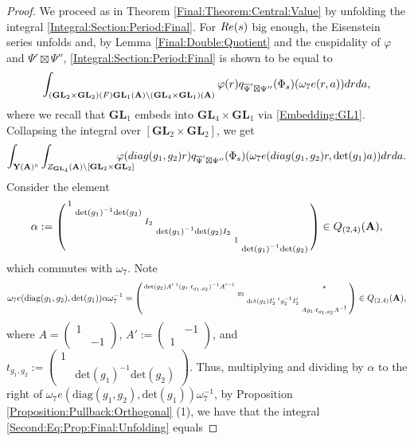 \documentclass[10pt,a4paper]{amsart}
\def\A{{\bf A}}
\def\GL{\mathbf{GL}}
\def\det{\mathrm{det}}
\begin{document}
\begin{proof}
    We proceed as in Theorem \ref{Final:Theorem:Central:Value} by unfolding the integral \eqref{Integral:Section:Period:Final}. For ${\rm Re}(s)$ big enough, the Eisenstein series unfolds and, by Lemma \ref{Final:Double:Quotient} and the cuspidality of $\varphi$ and $\Psi'\boxtimes\Psi''$, \eqref{Integral:Section:Period:Final} is shown to be equal to    \begin{equation}\label{First:Eq:Prop:Final:Unfolding}\int_{ (\GL_2 \times \GL_2)(F) \GL_1(\A) \backslash (\GL_4 \times \GL_1)(\A)}\varphi(r) q_{\overline{\Psi}'\boxtimes\Psi''}(\Phi_{s})(\omega_7 e(r,a)) drda,\end{equation}  
    where we recall that $\GL_1$ embeds into $\GL_4\times \GL_1$ via \eqref{Embedding:GL1}. Collapsing the integral over $[\GL_2 \times \GL_2]$, we get 
\begin{equation}\label{Second:Eq:Prop:Final:Unfolding}\int_{ \mathbf{Y}(\A)^\circ } \int_{Z_{\GL_4}(\A)\backslash [\GL_2\times \GL_2]} \!\!\!\!\!\!\!\!\!\!\! \varphi({\rm diag}(g_1,g_2)r) q_{\overline{\Psi}'\boxtimes\Psi''}(\Phi_{s})(\omega_7 e({\rm diag}(g_1,g_2) r,\det(g_1) a)) drda.\end{equation} 
    Consider the element
    \[\alpha := \left(\begin{smallmatrix}1& & & & &\\ &\mathrm{det}(g_1)^{-1}\mathrm{det}(g_2)& & & & \\ & & I_2& & &\\  & & &\mathrm{det}(g_1)^{-1}\mathrm{det}(g_2)I_2 & & \\   & & & &1 & \\   & & & & &\mathrm{det}(g_1)^{-1}\mathrm{det}(g_2)\end{smallmatrix}\right)\in  Q_{(2,4)}(\A),\]
which commutes with $\omega_7$. Note
    \[\omega_7 e(\mathrm{diag}(g_1,g_2),\mathrm{det}(g_1)) \alpha \omega_7^{-1} = \left(\begin{smallmatrix}\mathrm{det}(g_2)A'\;^t( g_1 \cdot t_{g_1,g_2} )^{-1}A'^{-1}  & & & \star\\ &g_2& & \\ & &\mathrm{det}(g_2)I_2'\;^tg_2^{-1}I_2'& \\ & & &A g_1 \cdot t_{g_1,g_2} A^{-1}\end{smallmatrix}\right)\in Q_{(2,4)}(\A),\]
    where $A= \left(\begin{smallmatrix}1& \\ &-1\end{smallmatrix}\right)$, $ A':= \left(\begin{smallmatrix} & -1\\1& \end{smallmatrix}\right)$, and  $t_{g_1,g_2} := \left(\begin{smallmatrix}1 & \\ &\mathrm{det}(g_1)^{-1}\mathrm{det}(g_2)\end{smallmatrix}\right)$. Thus, multiplying and dividing by $\alpha$ to the right of $\omega_7e(\mathrm{diag}(g_1,g_2),\mathrm{det}(g_1))\omega_7^{-1}$, by Proposition \ref{Proposition:Pullback:Orthogonal} (1), we have that the integral \eqref{Second:Eq:Prop:Final:Unfolding} equals

\end{proof}
\end{document}
